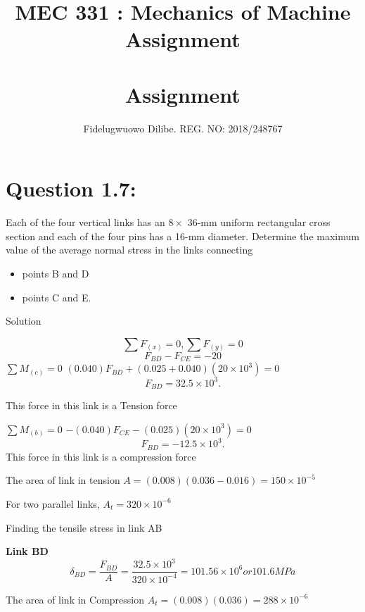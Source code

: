 \documentclass{article}
\title{MEC 331 : Mechanics of Machine Assignment}
\author{Fidelugwuowo Dilibe. REG. NO: 2018/248767 }
\begin{document}
\maketitle
\begin{center}\title{\section*{\textbf{{Assignment}}}}\end{center}
\newpage

\section*{\textbf{Question 1.7:}}
 Each of the four vertical links has an $ 8 \times $ 36-mm  uniform rectangular cross section and each of the four pins has a 16-mm diameter.
Determine the maximum value of the average normal stress in the
links connecting 
\begin{itemize}
	\item points B and D
	\item points C and E.
\end{itemize}
\begin{center} Solution \end{center}

\[\sum{}F_{(x)}=0,  \sum{}F_{(y)}=0 \]
\[F_{BD} - F_{CE} = -20\]
$\sum{}M_{(c)} = 0$
$(0.040)F_{BD} + (0.025 + 0.040)(20 \times 10^{3}) = 0 $
\[ F_{BD} = 32.5\times 10^{3}.  \]  \begin{center}This force in this link is a Tension force\end{center}

$\sum{}M_{(b)} = 0$
$-(0.040)F_{CE} - (0.025 )(20 \times 10^{3}) = 0 $
\[ F_{BD} = -12.5\times 10^{3}. \] This force in this link is a compression force



The area of link in tension  $A = (0.008)(0.036 - 0.016) = 150 \times 10 ^{-5}$

For two parallel links, $A_{t} = 320 \times 10 ^ {-6} $

Finding the tensile stress in link AB

\newline
\textbf{Link BD}
\[\delta_{BD} = \frac{F_{BD}}{A} = \frac{32.5 \times 10^{3}}{320 \times 10^{-4}} = {101.56 \times 10^{6}} or 101.6MPa\]

The area of link in Compression  $A_{t}= (0.008)(0.036 ) = 288 \times 10 ^{-6}$
\end{document}
